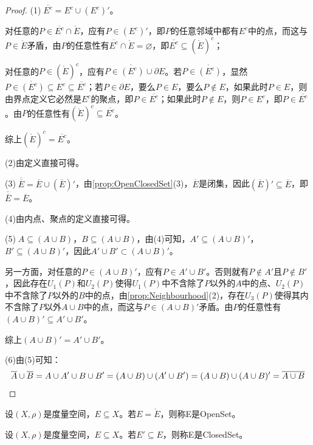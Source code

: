 \begin{proof}
	(1)$\;\overline{E^c}=E^c\cup (E^c)'$。\par
	对任意的$ P\in\overline{E^c}\cap\mathring{E}$，应有$P\in(E^c)'$，即$P$的任意邻域中都有$E^c$中的点，而这与$P\in\mathring{E}$矛盾，由$P$的任意性有$\overline{E^c}\cap\mathring{E}=\varnothing$，即$\overline{E^c}\subseteq(\mathring{E})^c$；\par
	对任意的$ P\in(\mathring{E})^c$，应有$P\in\mathring{(E^c)}\cup\partial E$。若$P\in\mathring{(E^c)}$，显然$P\in\mathring{(E^c)}\subseteq E^c\subseteq\overline{E^c}$；若$P\in\partial E$，要么$P\in E$，要么$P\notin E$，如果此时$P\in E$，则由界点定义它必然是$E^c$的聚点，即$P\in \overline{E^c}$；如果此时$P\notin E$，则$P\in E^c$，即$P\in \overline{E^c}$。由$P$的任意性有$(\mathring{E})^c\subseteq\overline{E^c}$。\par
	综上$(\mathring{E})^c=\overline{E^c}$。\par
	(2)由定义直接可得。\par
	(3)$\;\overline{\overline E}=\overline{E}\cup (\overline{E})'$，由\cref{prop:OpenClosedSet}(3)，$\overline{E}$是闭集，因此$(\overline{E})'\subseteq\overline{E}$，即$\overline{\overline E}=\overline{E}$。\par
	(4)由内点、聚点的定义直接可得。\par
	(5)$\;A\subseteq (A\cup B)$，$B\subseteq (A\cup B)$，由(4)可知，$A'\subseteq(A\cup B)'$，$B'\subseteq(A\cup B)'$，因此$A'\cup B'\subset(A\cup B)'$。\par
	另一方面，对任意的$ P\in (A\cup B)'$，应有$P\in A'\cup B'$。否则就有$P\notin A'$且$P\notin B'$，因此存在$U_1(P)$和$U_2(P)$使得$U_1(P)$中不含除了$P$以外的$A$中的点、$U_2(P)$中不含除了$P$以外的$B$中的点，由\cref{prop:Neighbourhood}(2)，存在$U_3(P)$使得其内不含除了$P$以外$A\cup B$中的点，而这与$P\in (A\cup B)'$矛盾。由$P$的任意性有$(A\cup B)'\subseteq A'\cup B'$。\par
	综上$(A\cup B)'=A'\cup B'$。\par
	(6)由(5)可知：
	\begin{equation*}
		\overline{A}\cup \overline{B}=A\cup A'\cup B\cup B'
		=(A\cup B)\cup(A'\cup B')=(A\cup B)\cup(A\cup B)'
		=\overline{A\cup B}\qedhere
	\end{equation*}
\end{proof}
\begin{definition}
	设$(X,\rho)$是度量空间，$E\subseteq X$。若$E=\mathring{E}$，则称E是\gls{OpenSet}。
\end{definition}
\begin{definition}
	设$(X,\rho)$是度量空间，$E\subseteq X$。若$E'\subseteq E$，则称E是\gls{ClosedSet}。
\end{definition}

